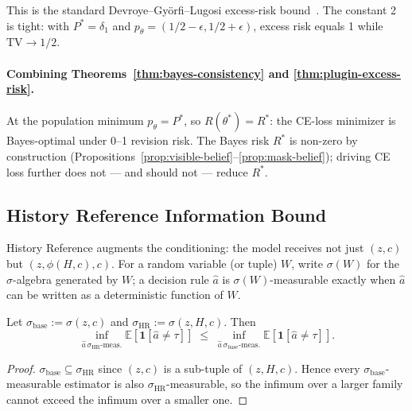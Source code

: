 \documentclass{llmxive}
\providecommand{\temporalmethodfull}{History Reference\xspace}
\begin{document}
\begin{remark}
This is the standard Devroye--Györfi--Lugosi excess-risk bound~\cite[Theorem~2.2]{devroye2013probabilistic}. The constant 2 is tight: with $P^* = \delta_1$ and $p_\theta = (1/2 - \epsilon, 1/2 + \epsilon)$, excess risk equals 1 while $\mathrm{TV} \to 1/2$.
\end{remark}

\paragraph{Combining Theorems~\ref{thm:bayes-consistency} and \ref{thm:plugin-excess-risk}.}
At the population minimum $p_\theta = P^*$, so $R(\theta^*) = R^*$: the CE-loss minimizer is Bayes-optimal under 0--1 revision risk. The Bayes risk $R^*$ is non-zero by construction (Propositions~\ref{prop:visible-belief}--\ref{prop:mask-belief}); driving CE loss further does not --- and should not --- reduce $R^*$.

\subsection{\temporalmethodfull{} Information Bound}
\label{app:history-monotonicity}

\temporalmethodfull augments the conditioning: the model receives not just $(z, c)$ but $(z, \phi(H, c), c)$. For a random variable (or tuple) $W$, write $\sigma(W)$ for the $\sigma$-algebra generated by $W$; a decision rule $\hat{a}$ is $\sigma(W)$-measurable exactly when $\hat{a}$ can be written as a deterministic function of $W$.

\begin{proposition}
\label{prop:history-monotonicity}
Let $\sigma_{\mathrm{base}} := \sigma(z, c)$ and $\sigma_{\mathrm{HR}} := \sigma(z, H, c)$. Then
\[
\inf_{\hat{a} \,\sigma_{\mathrm{HR}}\text{-meas.}} \mathbb{E}\!\left[\mathbf{1}\!\left[\hat{a} \neq \tau\right]\right] \;\leq\; \inf_{\hat{a} \,\sigma_{\mathrm{base}}\text{-meas.}} \mathbb{E}\!\left[\mathbf{1}\!\left[\hat{a} \neq \tau\right]\right].
\]
\end{proposition}

\begin{proof}
$\sigma_{\mathrm{base}} \subseteq \sigma_{\mathrm{HR}}$ since $(z, c)$ is a sub-tuple of $(z, H, c)$. Hence every $\sigma_{\mathrm{base}}$-measurable estimator is also $\sigma_{\mathrm{HR}}$-measurable, so the infimum over a larger family cannot exceed the infimum over a smaller one.
\end{proof}
\end{document}
